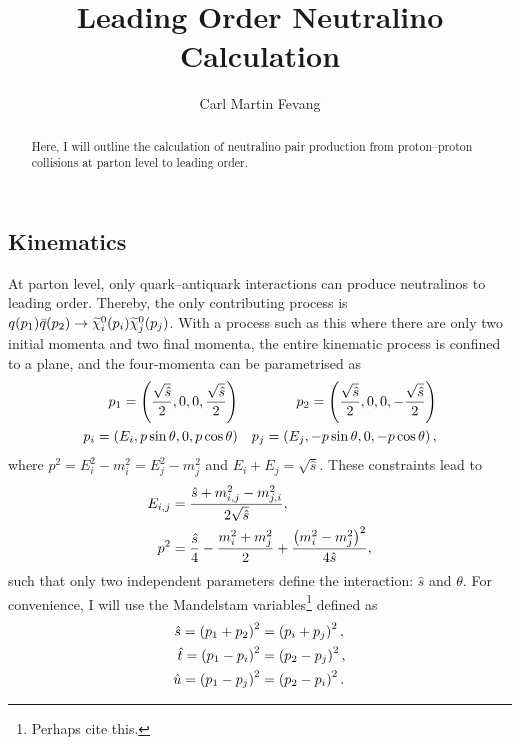 \documentclass[english,notitlepage]{article}
\title{Leading Order Neutralino Calculation}
\author{Carl Martin Fevang}
\begin{document}
\maketitle

\begin{abstract}
    \noindent
    Here, I will outline the calculation of neutralino pair production from proton--proton collisions at parton level to leading order.
\end{abstract}

\subsection{Kinematics}
    At parton level, only quark--antiquark interactions can produce neutralinos to leading order.
    Thereby, the only contributing process is \(q(p_1) \bar{q}(p_2) \to \nino[i](p_i) \nino[j](p_j)\).
    With a process such as this where there are only two initial momenta and two final momenta, the entire kinematic process is confined to a plane, and the four-momenta can be parametrised as
    \begin{subequations}
        \begin{align}
            p_1 = \pclosed{\frac{\sqrt{\hat{s}}}{2}, 0, 0, \frac{\sqrt{\hat{s}}}{2}} &  & p_2 = \pclosed{\frac{\sqrt{\hat{s}}}{2}, 0, 0, -\frac{\sqrt{\hat{s}}}{2}} \\
            p_i = \pclosed{E_i, p \sin\theta, 0, p \cos\theta}                       &  & p_j = \pclosed{E_j, -p\sin\theta, 0, -p\cos\theta},
        \end{align}
    \end{subequations}
    where \(p^2 = E_i^2 - m_i^2 = E_j^2 - m_j^2\) and \(E_i + E_j = \sqrt{\hat{s}}\).
    These constraints lead to
    \begin{subequations}
        \begin{align}
            E_{i, j} & = \frac{\hat{s} + m_{i, j}^2 - m_{j, i}^2}{2 \sqrt{\hat{s}}},                               \\
            p^2      & = \frac{\hat{s}}{4} - \frac{m_i^2 + m_j^2}{2} + \frac{\pclosed{m_i^2 - m_j^2}^2}{4\hat{s}},
        \end{align}
    \end{subequations}
    such that only two independent parameters define the interaction: \(\hat{s}\) and \(\theta\).
    For convenience, I will use the Mandelstam variables\footnote{Perhaps cite this.} defined as
    \begin{subequations}
        \begin{align}
            \hat{s} = \pclosed{p_1 + p_2}^2 & = \pclosed{p_i + p_j}^2, \\
            \hat{t} = \pclosed{p_1-p_i}^2   & = \pclosed{p_2-p_j}^2,   \\
            \hat{u} = \pclosed{p_1-p_j}^2   & = \pclosed{p_2-p_i}^2.   \\
        \end{align}
    \end{subequations}
\end{document}
